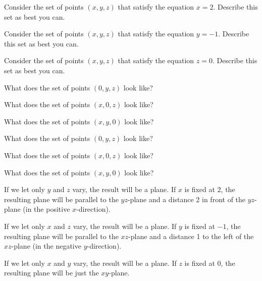 \begin{activity} \label{A:9.1.3}
    \ba
    \item Consider the set of points $(x,y,z)$ that satisfy the equation $x=2$. Describe this set as best you can.

    \item Consider the set of points $(x,y,z)$ that satisfy the equation $y=-1$. Describe this set as best you can.


    \item Consider the set of points $(x,y,z)$ that satisfy the equation $z=0$. Describe this set as best you can.


    \ea
\end{activity}
\begin{smallhint}
\ba
\item What does the set of points $(0,y,z)$ look like? 
\item What does the set of points $(x,0,z)$ look like?
\item What does the set of points $(x,y,0)$ look like?
\ea
\end{smallhint}
\begin{bighint}
\ba
\item What does the set of points $(0,y,z)$ look like? 
\item What does the set of points $(x,0,z)$ look like?
\item What does the set of points $(x,y,0)$ look like?
\ea
\end{bighint}
\begin{activitySolution}
\ba
\item If we let only $y$ and $z$ vary, the result will be a plane. If $x$ is fixed at $2$, the resulting plane will be parallel to the $yz$-plane and a distance 2 in front of the $yz$-plane (in the positive $x$-direction).   
\item If we let only $x$ and $z$ vary, the result will be a plane. If $y$ is fixed at $-1$, the resulting plane will be parallel to the $xz$-plane and a distance 1 to the left of the $xz$-plane (in the negative $y$-direction). 
\item If we let only $x$ and $y$ vary, the result will be a plane. If $z$ is fixed at $0$, the resulting plane will be just the $xy$-plane. 
\ea
\end{activitySolution}
\aftera 